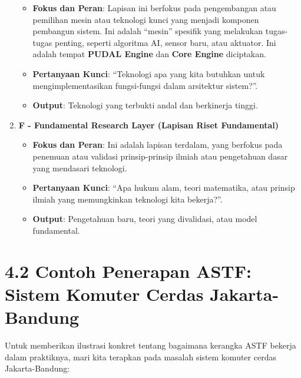 \documentclass[
  letterpaper,
  DIV=11,
  numbers=noendperiod]{scrreprt}
\providecommand{\tightlist}{%
  \setlength{\itemsep}{0pt}\setlength{\parskip}{0pt}}
\begin{document}
\begin{enumerate}
  \begin{itemize}
  \tightlist
  \item
    \textbf{Fokus dan Peran}: Lapisan ini berfokus pada pengembangan
    atau pemilihan mesin atau teknologi kunci yang menjadi komponen
    pembangun sistem. Ini adalah ``mesin'' spesifik yang melakukan
    tugas-tugas penting, seperti algoritma AI, sensor baru, atau
    aktuator. Ini adalah tempat \textbf{PUDAL Engine} dan \textbf{Core
    Engine} diciptakan.
  \item
    \textbf{Pertanyaan Kunci}: ``Teknologi apa yang kita butuhkan untuk
    mengimplementasikan fungsi-fungsi dalam arsitektur sistem?''.
  \item
    \textbf{Output}: Teknologi yang terbukti andal dan berkinerja
    tinggi.
  \end{itemize}
\item
  \textbf{F - Fundamental Research Layer (Lapisan Riset Fundamental)}

  \begin{itemize}
  \tightlist
  \item
    \textbf{Fokus dan Peran}: Ini adalah lapisan terdalam, yang berfokus
    pada penemuan atau validasi prinsip-prinsip ilmiah atau pengetahuan
    dasar yang mendasari teknologi.
  \item
    \textbf{Pertanyaan Kunci}: ``Apa hukum alam, teori matematika, atau
    prinsip ilmiah yang memungkinkan teknologi kita bekerja?''.
  \item
    \textbf{Output}: Pengetahuan baru, teori yang divalidasi, atau model
    fundamental.
  \end{itemize}
\end{enumerate}

\section{\texorpdfstring{\textbf{4.2 Contoh Penerapan ASTF: Sistem
Komuter Cerdas
Jakarta-Bandung}}{4.2 Contoh Penerapan ASTF: Sistem Komuter Cerdas Jakarta-Bandung}}\label{contoh-penerapan-astf-sistem-komuter-cerdas-jakarta-bandung}

Untuk memberikan ilustrasi konkret tentang bagaimana kerangka ASTF
bekerja dalam praktiknya, mari kita terapkan pada masalah sistem komuter
cerdas Jakarta-Bandung:
\end{document}
